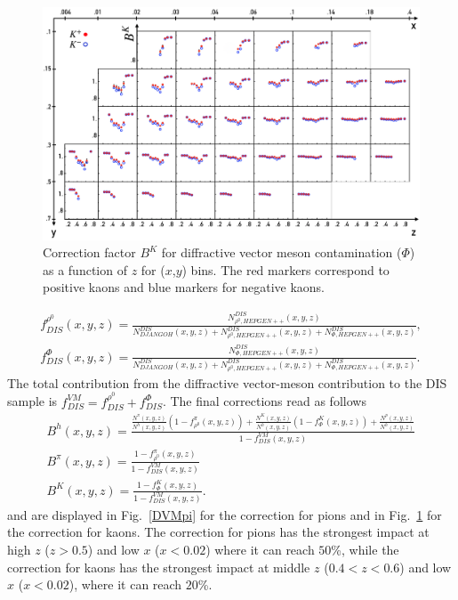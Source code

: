 \begin{figure}
  \centering
	\includegraphics[scale=0.8]{./gfx/DVMK.png}
	\caption{Correction factor $B^{K}$ for diffractive vector meson contamination ($\Phi$) as a function of $z$ for ($x$,$y$) bins. The red markers correspond to positive kaons and blue markers for negative kaons.}
	\label{DVMK}
\end{figure}
%
\begin{equation}\label{eq:DVMDIS}
  \begin{split}
    f^{\rho^0}_{DIS}(x,y,z) = \frac{N^{DIS}_{\rho^0,HEPGEN++}(x,y,z)}{N^{DIS}_{DJANGOH}(x,y,z)+N^{DIS}_{\rho^0,HEPGEN++}(x,y,z)+N^{DIS}_{\Phi,HEPGEN++}(x,y,z)}, \\
    f^{\Phi}_{DIS}(x,y,z) = \frac{N^{DIS}_{\Phi,HEPGEN++}(x,y,z)}{N^{DIS}_{DJANGOH}(x,y,z)+N^{DIS}_{\rho^0,HEPGEN++}(x,y,z)+N^{DIS}_{\Phi,HEPGEN++}(x,y,z)}.
  \end{split}
\end{equation}
%
The total contribution from the diffractive vector-meson contribution to the DIS sample is $f^{VM}_{DIS} = f^{\rho^0}_{DIS} + f^{\Phi}_{DIS}$. The final corrections read as follows
%
\begin{equation}
  \begin{split}
  B^h(x,y,z) = \frac{ \frac{N^{\pi}(x,y,z)}{N^h(x,y,z)}\left (1-f^{\pi}_{\rho^0}(x,y,z)\right )
                   + \frac{N^K(x,y,z)}{N^h(x,y,z)}\left (1-f^{K}_{\Phi}(x,y,z)\right ) + \frac{N^p(x,y,z)}{N^h(x,y,z)} }{1-f^{VM}_{DIS}(x,y,z)} \\
  B^{\pi}(x,y,z) = \frac{1-f^{\pi}_{\rho^0}(x,y,z)}{1-f^{VM}_{DIS}(x,y,z)} \\
  B^K(x,y,z) = \frac{1-f^{K}_{\Phi}(x,y,z)}{1-f^{VM}_{DIS}(x,y,z)}.
  \end{split}
\end{equation}
%
and are displayed in Fig.~\ref{DVMpi} for the correction for pions and in Fig.~\ref{DVMK} for the correction for kaons. The correction for pions has the strongest impact at high $z$ ($z>0.5$) and low $x$ ($x<0.02$) where it can reach $50$\%, while the correction for kaons has the strongest impact at middle $z$ ($0.4<z<0.6$) and low $x$ ($x<0.02$), where it can reach $20$\%.

